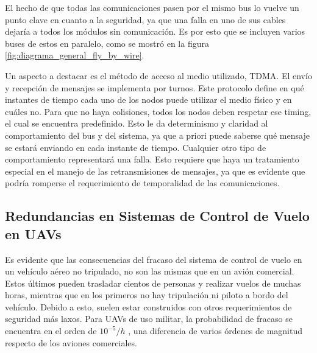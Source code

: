 El hecho de que todas las comunicaciones pasen por el mismo bus lo vuelve un punto clave en cuanto a la seguridad, ya que una falla en uno de sus cables dejaría a todos los módulos sin comunicación. Es por esto que se incluyen varios buses de estos en paralelo, como se mostró en la figura \ref{fig:diagrama_general_fly_by_wire}.

Un aspecto a destacar es el método de acceso al medio utilizado, TDMA. El envío y recepción de mensajes se implementa por turnos. Este protocolo define en qué instantes de tiempo cada uno de los nodos puede utilizar el medio físico y en cuáles no. Para que no haya colisiones, todos los nodos deben respetar ese timing, el cual se encuentra predefinido. Esto le da determinismo y claridad al comportamiento del bus y del sistema, ya que a priori puede saberse qué mensaje se estará enviando en cada instante de tiempo. Cualquier otro tipo de comportamiento representará una falla. Esto requiere que haya un tratamiento especial en el manejo de las retransmisiones de mensajes, ya que es evidente que podría romperse el requerimiento de temporalidad de las comunicaciones.







\subsection{Redundancias en Sistemas de Control de Vuelo en UAVs}

Es evidente que las consecuencias del fracaso del sistema de control de vuelo en un vehículo aéreo no tripulado, no son las mismas que en un avión comercial. Estos últimos pueden trasladar cientos de personas y realizar vuelos de muchas horas, mientras que en los primeros no hay tripulación ni piloto a bordo del vehículo. Debido a esto, suelen estar construidos con otros requerimientos de seguridad más laxos. Para UAVs de uso militar, la probabilidad de fracaso se encuentra en el orden de $10^{-5} / h$ \cite{zhang2020architecture}\cite[p.~491]{collinson2023introduction}, una diferencia de varios órdenes de magnitud respecto de los aviones comerciales.

